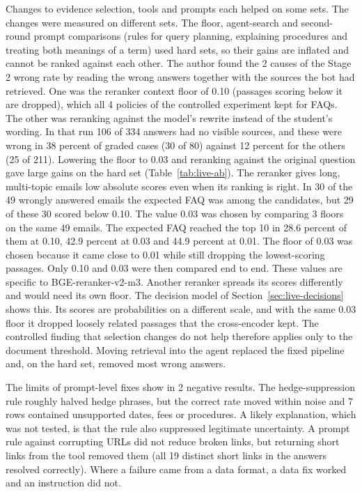 Changes to evidence selection, tools and prompts each helped on some sets. The changes were measured on different sets. The floor, agent-search and second-round prompt comparisons (rules for query planning, explaining procedures and treating both meanings of a term) used hard sets, so their gains are inflated and cannot be ranked against each other. The author found the 2 causes of the Stage 2 wrong rate by reading the wrong answers together with the sources the bot had retrieved. One was the reranker context floor of 0.10 (passages scoring below it are dropped), which all 4 policies of the controlled experiment kept for FAQs. The other was reranking against the model's rewrite instead of the student's wording. In that run 106 of 334 answers had no visible sources, and these were wrong in 38 percent of graded cases (30 of 80) against 12 percent for the others (25 of 211). Lowering the floor to 0.03 and reranking against the original question gave large gains on the hard set (Table~\ref{tab:live-ab}). The reranker gives long, multi-topic emails low absolute scores even when its ranking is right. In 30 of the 49 wrongly answered emails the expected FAQ was among the candidates, but 29 of these 30 scored below 0.10. The value 0.03 was chosen by comparing 3 floors on the same 49 emails. The expected FAQ reached the top 10 in 28.6 percent of them at 0.10, 42.9 percent at 0.03 and 44.9 percent at 0.01. The floor of 0.03 was chosen because it came close to 0.01 while still dropping the lowest-scoring passages. Only 0.10 and 0.03 were then compared end to end. These values are specific to BGE-reranker-v2-m3. Another reranker spreads its scores differently and would need its own floor. The decision model of Section~\ref{sec:live-decisions} shows this. Its scores are probabilities on a different scale, and with the same 0.03 floor it dropped loosely related passages that the cross-encoder kept. The controlled finding that selection changes do not help therefore applies only to the document threshold. Moving retrieval into the agent replaced the fixed pipeline and, on the hard set, removed most wrong answers.

The limits of prompt-level fixes show in 2 negative results. The hedge-suppression rule roughly halved hedge phrases, but the correct rate moved within noise and 7 rows contained unsupported dates, fees or procedures. A likely explanation, which was not tested, is that the rule also suppressed legitimate uncertainty. A prompt rule against corrupting URLs did not reduce broken links, but returning short links from the tool removed them (all 19 distinct short links in the answers resolved correctly). Where a failure came from a data format, a data fix worked and an instruction did not.


